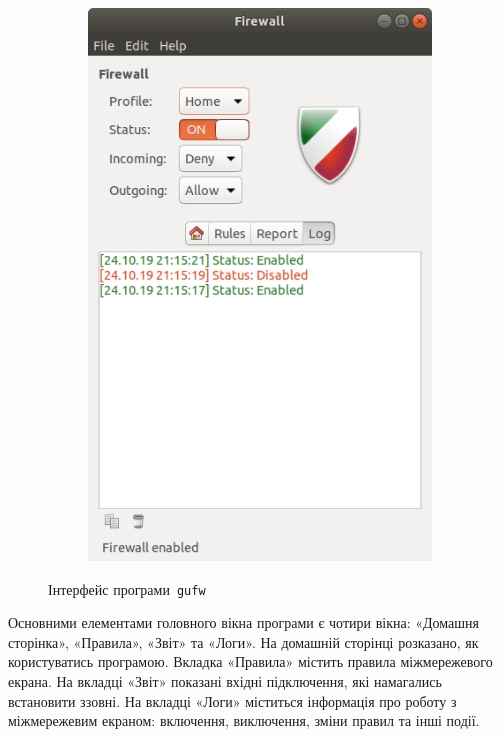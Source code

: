 \documentclass[
	a4paper,
	oneside,
	BCOR = 10mm,
	DIV = 12,
	12pt,
	headings = normal,
]{scrartcl}
\newlength{\gridunitwidth}
\newcommand{\progname}[1]{\texttt{#1}}
\begin{document}
\begin{figure}[!htbp]
\begin{subfigure}[b]{3 \gridunitwidth - 1em / 4}
				\includegraphics[width = \columnwidth]{./assets/04.png}
				\caption{}
				\label{subfig:01-04}
			\end{subfigure}%
			\caption{Інтерфейс програми~\progname{\textenglish{gufw}}}
			\label{fig:01-gufw}
		\end{figure}

		Основними елементами головного вікна програми є чотири вікна: «Домашня сторінка», «Правила», «Звіт» та «Логи». На домашній сторінці розказано, як користуватись програмою. Вкладка «Правила» містить правила міжмережевого екрана. На вкладці «Звіт» показані вхідні підключення, які намагались встановити ззовні. На вкладці «Логи» міститься інформація про роботу з міжмережевим екраном: включення, виключення, зміни правил та інші події.
\end{document}
